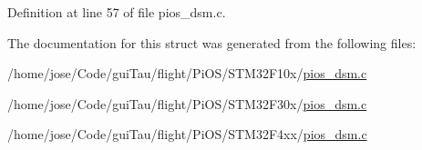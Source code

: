 Definition at line 57 of file pios\-\_\-dsm.\-c.



The documentation for this struct was generated from the following files\-:\begin{DoxyCompactItemize}
\item 
/home/jose/\-Code/gui\-Tau/flight/\-Pi\-O\-S/\-S\-T\-M32\-F10x/\hyperlink{_s_t_m32_f10x_2pios__dsm_8c}{pios\-\_\-dsm.\-c}\item 
/home/jose/\-Code/gui\-Tau/flight/\-Pi\-O\-S/\-S\-T\-M32\-F30x/\hyperlink{_s_t_m32_f30x_2pios__dsm_8c}{pios\-\_\-dsm.\-c}\item 
/home/jose/\-Code/gui\-Tau/flight/\-Pi\-O\-S/\-S\-T\-M32\-F4xx/\hyperlink{_s_t_m32_f4xx_2pios__dsm_8c}{pios\-\_\-dsm.\-c}\end{DoxyCompactItemize}
